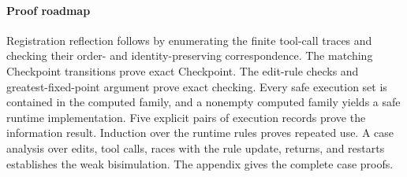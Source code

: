 \paragraph{Proof roadmap}
Registration reflection follows by enumerating the finite tool-call traces and checking their order- and identity-preserving correspondence.
The matching Checkpoint transitions prove exact Checkpoint.
The edit-rule checks and greatest-fixed-point argument prove exact checking.
Every safe execution set is contained in the computed family, and a nonempty computed family yields a safe runtime implementation.
Five explicit pairs of execution records prove the information result.
Induction over the runtime rules proves repeated use.
A case analysis over edits, tool calls, races with the rule update, returns, and restarts establishes the weak bisimulation.
The appendix gives the complete case proofs.
